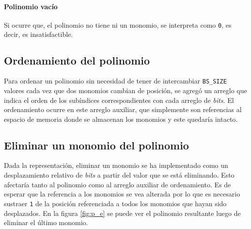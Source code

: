 \paragraph{Polinomio vacío} Si ocurre que, el polinomio no tiene ni un monomio, se interpreta como \texttt{0}, es decir, es insatisfactible.

\subsection{Ordenamiento del polinomio}

Para ordenar un polinomio sin necesidad de tener de intercambiar \texttt{BS\_SIZE} valores cada vez que dos monomios cambian de posición, se agregó un arreglo que indica el orden de los subíndices correspondientes con cada arreglo de \textit{bits}. El ordenamiento ocurre en este arreglo auxiliar, que simplemente son referencias al espacio de memoria donde se almacenan los monomios y este quedaría intacto.

\subsection{Eliminar un monomio del polinomio}

Dada la representación, eliminar un monomio se ha implementado como un desplazamiento relativo de \textit{bits} a partir del valor que se está eliminando. Esto afectaría tanto al polinomio como al arreglo auxiliar de ordenamiento. Es de esperar que la referencia a los monomios se vea alterada por lo que es necesario sustraer \texttt{1} de la posición referenciada a todos los monomios que hayan sido desplazados. En la figura \ref{fig:p_e} se puede ver el polinomio resultante luego de eliminar el último monomio.


